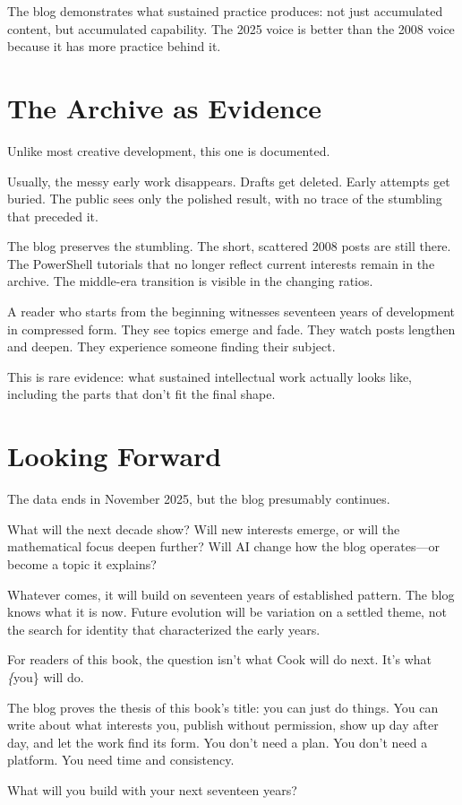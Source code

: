 The blog demonstrates what sustained practice produces: not just accumulated content, but accumulated capability. The 2025 voice is better than the 2008 voice because it has more practice behind it.

\bigskip

\section*{The Archive as Evidence}

Unlike most creative development, this one is documented.

Usually, the messy early work disappears. Drafts get deleted. Early attempts get buried. The public sees only the polished result, with no trace of the stumbling that preceded it.

The blog preserves the stumbling. The short, scattered 2008 posts are still there. The PowerShell tutorials that no longer reflect current interests remain in the archive. The middle-era transition is visible in the changing ratios.

A reader who starts from the beginning witnesses seventeen years of development in compressed form. They see topics emerge and fade. They watch posts lengthen and deepen. They experience someone finding their subject.

This is rare evidence: what sustained intellectual work actually looks like, including the parts that don't fit the final shape.

\bigskip

\section*{Looking Forward}

The data ends in November 2025, but the blog presumably continues.

What will the next decade show? Will new interests emerge, or will the mathematical focus deepen further? Will AI change how the blog operates—or become a topic it explains?

Whatever comes, it will build on seventeen years of established pattern. The blog knows what it is now. Future evolution will be variation on a settled theme, not the search for identity that characterized the early years.

For readers of this book, the question isn't what Cook will do next. It's what \textit\{you\} will do.

The blog proves the thesis of this book's title: you can just do things. You can write about what interests you, publish without permission, show up day after day, and let the work find its form. You don't need a plan. You don't need a platform. You need time and consistency.

What will you build with your next seventeen years?


